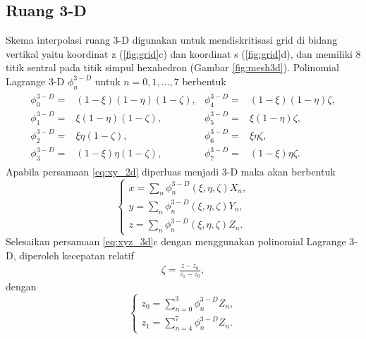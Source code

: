 \begin{spacing}{1.5}
\subsection[Ruang 3-D]{Ruang 3-D}
	Skema interpolasi ruang 3-D digunakan untuk mendiskritisasi grid di bidang vertikal yaitu koordinat z (\ref{fig:grid}c) dan koordinat s (\ref{fig:grid}d), dan memiliki 8 titik sentral pada titik simpul hexahedron (Gambar \ref{fig:mesh3d}). Polinomial Lagrange 3-D $\phi_n^{3-D}$ untuk $n = 0,1,\dots,7$ berbentuk
	\begin{equation*}
		\begin{aligned}
			\begin{matrix}
				\phi_0^{3-D} =& (1-\xi)(1-\eta)(1-\zeta), & \phi_4^{3-D} =& (1-\xi)(1-\eta)\zeta, \\
				\phi_1^{3-D} =& \xi(1-\eta)(1-\zeta),  & \phi_5^{3-D} =& \xi(1-\eta)\zeta, \\
				\phi_2^{3-D} =& \xi \eta(1-\zeta),  & \phi_6^{3-D} =& \xi\eta\zeta, \\
				\phi_3^{3-D} =& (1-\xi)\eta(1-\zeta),  & \phi_7^{3-D} =& (1-\xi)\eta\zeta.
			\end{matrix}
		\end{aligned}
	\end{equation*}
	Apabila persamaan \ref{eq:xy_2d} diperluas menjadi 3-D maka akan berbentuk
	\begin{equation}\label{eq:xyz_3d}
		\begin{cases}
			x = \sum_n \phi_{n}^{3-D}(\xi,\eta,\zeta)X_n,\\
			y = \sum_n \phi_{n}^{3-D}(\xi,\eta,\zeta)Y_n,\\
			z = \sum_n \phi_{n}^{3-D}(\xi,\eta,\zeta)Z_n.
		\end{cases}		
	\end{equation}
	Selesaikan persamaan \ref{eq:xyz_3d}c dengan menggunakan polinomial Lagrange 3-D, diperoleh kecepatan relatif
	\begin{equation}\label{eq:zeta_velo}
		\begin{aligned}
			\zeta = \frac{z-z_0}{z_1-z_0},
		\end{aligned}
	\end{equation}
	dengan 
	\begin{equation*}
		\begin{cases}
			z_0 = \sum_{n=0}^{3}\phi_n^{3-D}Z_n, \\
			z_1 = \sum_{n=4}^{7}\phi_n^{3-D}Z_n.
		\end{cases}
	\end{equation*}
	\begin{figure}[H]

\end{figure}
\end{spacing}
